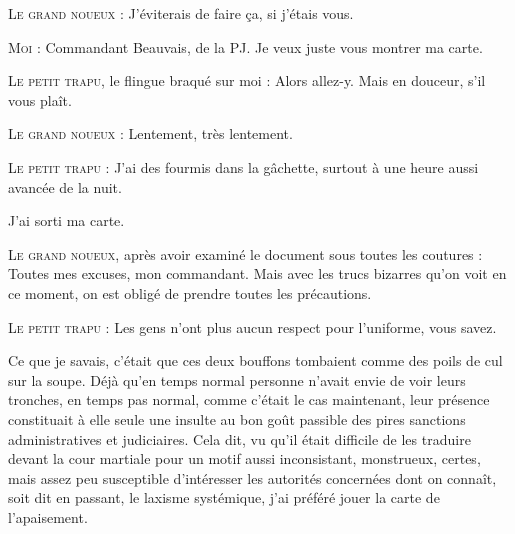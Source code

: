 \begin{dialogue}

\textsc{Le grand noueux} : J’éviterais de faire ça, si j’étais vous.

\textsc{Moi} : Commandant Beauvais, de la PJ. Je veux juste vous montrer ma carte.

\textsc{Le petit trapu}, le flingue braqué sur moi : Alors allez-y. Mais en douceur, s’il vous plaît.

\textsc{Le grand noueux} : Lentement, très lentement.

\textsc{Le petit trapu} : J’ai des fourmis dans la gâchette, surtout à une heure aussi avancée de la nuit.

\end{dialogue}

J’ai sorti ma carte.

\begin{dialogue}

\textsc{Le grand noueux}, après avoir examiné le document sous toutes les coutures : Toutes mes excuses, mon commandant. Mais avec les trucs bizarres qu’on voit en ce moment, on est obligé de prendre toutes les précautions.

\textsc{Le petit trapu} : Les gens n’ont plus aucun respect pour l’uniforme, vous savez.

\end{dialogue}

Ce que je savais, c’était que ces deux bouffons tombaient comme des poils de cul sur la soupe. Déjà qu’en temps normal personne n’avait envie de voir leurs tronches, en temps pas normal, comme c’était le cas maintenant, leur présence constituait à elle seule une insulte au bon goût passible des pires sanctions administratives et judiciaires. Cela dit, vu qu’il était difficile de les traduire devant la cour martiale pour un motif aussi inconsistant, monstrueux, certes, mais assez peu susceptible d’intéresser les autorités concernées dont on connaît, soit dit en passant, le laxisme systémique, j’ai préféré jouer la carte de l’apaisement.

